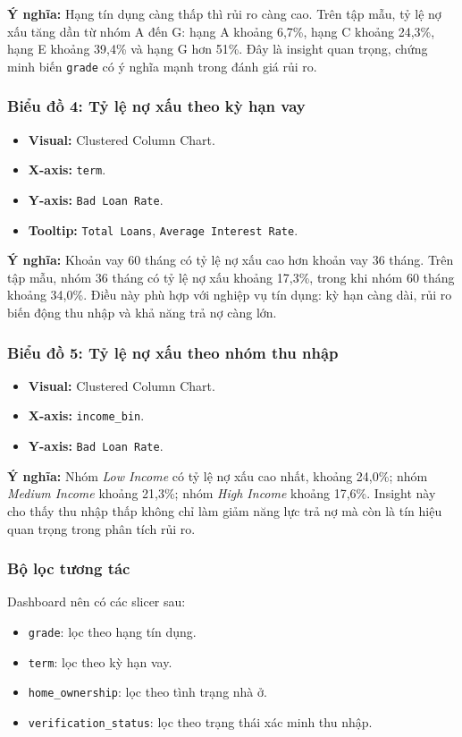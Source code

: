 \textbf{Ý nghĩa:} Hạng tín dụng càng thấp thì rủi ro càng cao. Trên tập mẫu, tỷ lệ nợ xấu tăng dần từ nhóm A đến G: hạng A khoảng 6,7\%, hạng C khoảng 24,3\%, hạng E khoảng 39,4\% và hạng G hơn 51\%. Đây là insight quan trọng, chứng minh biến \texttt{grade} có ý nghĩa mạnh trong đánh giá rủi ro.

\subsubsection{Biểu đồ 4: Tỷ lệ nợ xấu theo kỳ hạn vay}
\begin{itemize}
    \item \textbf{Visual:} Clustered Column Chart.
    \item \textbf{X-axis:} \texttt{term}.
    \item \textbf{Y-axis:} \texttt{Bad Loan Rate}.
    \item \textbf{Tooltip:} \texttt{Total Loans}, \texttt{Average Interest Rate}.
\end{itemize}

\textbf{Ý nghĩa:} Khoản vay 60 tháng có tỷ lệ nợ xấu cao hơn khoản vay 36 tháng. Trên tập mẫu, nhóm 36 tháng có tỷ lệ nợ xấu khoảng 17,3\%, trong khi nhóm 60 tháng khoảng 34,0\%. Điều này phù hợp với nghiệp vụ tín dụng: kỳ hạn càng dài, rủi ro biến động thu nhập và khả năng trả nợ càng lớn.

\subsubsection{Biểu đồ 5: Tỷ lệ nợ xấu theo nhóm thu nhập}
\begin{itemize}
    \item \textbf{Visual:} Clustered Column Chart.
    \item \textbf{X-axis:} \texttt{income\_bin}.
    \item \textbf{Y-axis:} \texttt{Bad Loan Rate}.
\end{itemize}

\textbf{Ý nghĩa:} Nhóm \textit{Low Income} có tỷ lệ nợ xấu cao nhất, khoảng 24,0\%; nhóm \textit{Medium Income} khoảng 21,3\%; nhóm \textit{High Income} khoảng 17,6\%. Insight này cho thấy thu nhập thấp không chỉ làm giảm năng lực trả nợ mà còn là tín hiệu quan trọng trong phân tích rủi ro.

\subsubsection{Bộ lọc tương tác}
Dashboard nên có các slicer sau:
\begin{itemize}
    \item \texttt{grade}: lọc theo hạng tín dụng.
    \item \texttt{term}: lọc theo kỳ hạn vay.
    \item \texttt{home\_ownership}: lọc theo tình trạng nhà ở.
    \item \texttt{verification\_status}: lọc theo trạng thái xác minh thu nhập.
\end{itemize}

